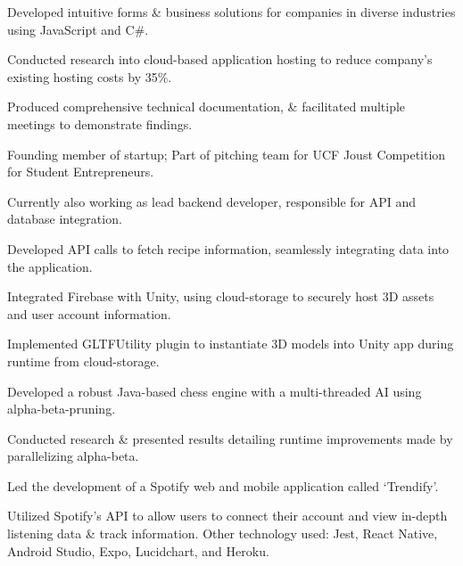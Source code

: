 \documentclass[]{deedy-resume-openfont}
\begin{document}
\begin{tightemize}
\item Developed intuitive forms \& business solutions for companies in diverse industries using JavaScript and C\#.
\item Conducted research into cloud-based application hosting to reduce company's existing hosting costs by 35\%.
\item Produced comprehensive technical documentation, \& facilitated multiple meetings to demonstrate findings.
\end{tightemize}



\begin{tightemize}
\item Founding member of startup; Part of pitching team for UCF Joust Competition for Student Entrepreneurs. 
\item Currently also working as lead backend developer, responsible for API and database integration. 
\item Developed API calls to fetch recipe information, seamlessly integrating data into the application.
\item Integrated Firebase with Unity, using cloud-storage to securely host 3D assets and user account information.
\item Implemented GLTFUtility plugin to instantiate 3D models into Unity app during runtime from cloud-storage.
\end{tightemize}
\vspace{8pt}

\begin{tightemize}
\item Developed a robust Java-based chess engine with a multi-threaded AI using alpha-beta-pruning. 
\item Conducted research \& presented results detailing runtime improvements made by parallelizing alpha-beta.
\end{tightemize}
\sectionsep

\begin{tightemize}
\item Led the development of a Spotify web and mobile application called ‘Trendify’. 
\item Utilized Spotify’s API to allow users to connect their account and view in-depth listening data \& track information. Other technology used: Jest, React Native, Android Studio, Expo, Lucidchart, and Heroku.
\end{tightemize}
\end{document}
